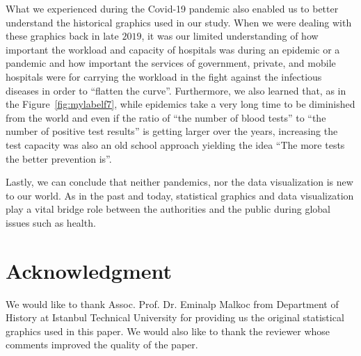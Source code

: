 What we experienced during the Covid-19 pandemic also enabled us to better understand the historical graphics used in our study. When we were dealing with these graphics back in late $2019$, it was our limited understanding of how important the workload and capacity of hospitals was during an epidemic or a pandemic and how important the services of government, private, and mobile hospitals were for carrying the workload in the fight against the infectious diseases in order to \enquote{flatten the curve}. Furthermore, we also learned that, as in the Figure~\ref{fig:mylabelf7}, while epidemics take a very long time to be diminished from the world and even if the ratio of \enquote{the number of blood tests} to \enquote{the number of positive test results} is getting larger over the years, increasing the test capacity was also an old school approach yielding the idea \enquote{The more tests the better prevention is}. 

Lastly, we can conclude that neither pandemics, nor the data visualization is new to our world. As in the past and today, statistical graphics and data visualization play a vital bridge role between the authorities and the public during global issues such as health.







\section*{Acknowledgment}
We would like to thank Assoc. Prof. Dr. Eminalp Malkoc from Department of History at Istanbul Technical University for providing us the original statistical graphics used in this paper. We would also like
to thank the reviewer whose comments improved the quality of the paper.





\address{Sami Aldag\\
Department of Mathematics Engineering, \\
Istanbul Technical University, \\
Istanbul, 34469,\\
Turkey \\
  }

\address{Dogukan Topcuoglu\\
Department of Mathematics Engineering, \\
Istanbul Technical University, \\
Istanbul, 34469,\\
Turkey \\
 }

\address{Gul Inan\\
Department of Mathematics, \\
Istanbul Technical University, \\
Istanbul, 34469,\\
Turkey \\
 (ORCiD: 0000-0002-3981-9211)\\
  }
